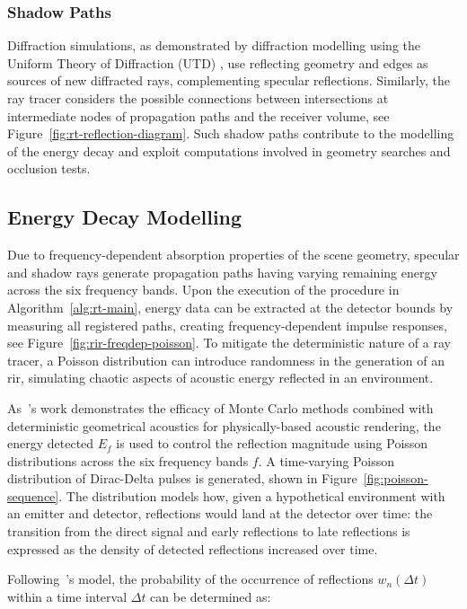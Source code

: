 \subsubsection{Shadow Paths}
Diffraction simulations, as demonstrated by diffraction modelling using the Uniform Theory of Diffraction (UTD) \cite{tsingos2001modeling}, use reflecting geometry and edges as sources of new diffracted rays, complementing specular reflections. Similarly, the ray tracer considers the possible connections between intersections at intermediate nodes of propagation paths and the receiver volume, see Figure~\ref{fig:rt-reflection-diagram}. Such shadow paths contribute to the modelling of the energy decay and exploit computations involved in geometry searches and occlusion tests. \par

\subsection{Energy Decay Modelling}
Due to frequency-dependent absorption properties of the scene geometry, specular and shadow rays generate propagation paths having varying remaining energy across the six frequency bands. Upon the execution of the procedure in Algorithm~\ref{alg:rt-main}, energy data can be extracted at the detector bounds by measuring all registered paths, creating frequency-dependent impulse responses, see Figure~\ref{fig:rir-freqdep-poisson}. To mitigate the deterministic nature of a ray tracer, a Poisson distribution can introduce randomness in the generation of an \acrshort{rir}, simulating chaotic aspects of acoustic energy reflected in an environment. \par
As~\cite{schroder2011physically}'s work demonstrates the efficacy of Monte Carlo methods combined with deterministic geometrical acoustics for physically-based acoustic rendering, the energy detected $E_f$ is used to control the reflection magnitude using Poisson distributions across the six frequency bands $f$. A time-varying Poisson distribution of Dirac-Delta pulses is generated, shown in Figure~\ref{fig:poisson-sequence}. The distribution models how, given a hypothetical environment with an emitter and detector, reflections would land at the detector over time: the transition from the direct signal and early reflections to late reflections is expressed as the density of detected reflections increased over time. \par
Following~\cite{schroder2011physically}'s model, the probability of the occurrence of reflections $w_n(\Delta t)$ within a time interval $\Delta t$ can be determined as:

